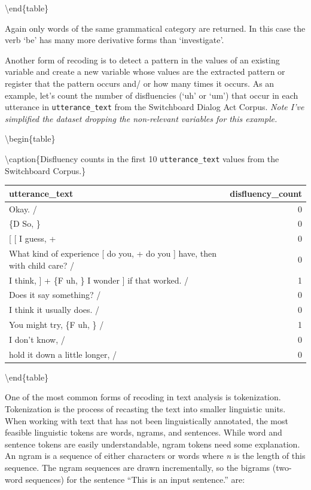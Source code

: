 \documentclass[
]{article}
\begin{document}
\textbackslash end\{table\}

Again only words of the same grammatical category are returned. In this case the verb `be' has many more derivative forms than `investigate'.

Another form of recoding is to detect a pattern in the values of an existing variable and create a new variable whose values are the extracted pattern or register that the pattern occurs and/ or how many times it occurs. As an example, let's count the number of disfluencies (`uh' or `um') that occur in each utterance in \texttt{utterance\_text} from the Switchboard Dialog Act Corpus. \emph{Note I've simplified the dataset dropping the non-relevant variables for this example.}

\textbackslash begin\{table\}

\textbackslash caption\{\label{tab:recoding-extract-switchboard}Disfluency counts in the first 10 \texttt{utterance\_text} values from the Switchboard Corpus.\}
\centering

\begin{tabular}[t]{lr}
\toprule
utterance\_text & disfluency\_count\\
\midrule
Okay.  / & 0\\
\{D So, \} & 0\\
{}[ [ I guess, + & 0\\
What kind of experience [ do you, + do you ] have, then with child care? / & 0\\
I think, ] + \{F uh, \} I wonder ] if that worked. / & 1\\
\addlinespace
Does it say something? / & 0\\
I think it usually does.  / & 0\\
You might try, \{F uh, \}  / & 1\\
I don't know,  / & 0\\
hold it down a little longer,  / & 0\\
\bottomrule
\end{tabular}

\textbackslash end\{table\}

One of the most common forms of recoding in text analysis is tokenization. Tokenization is the process of recasting the text into smaller linguistic units. When working with text that has not been linguistically annotated, the most feasible linguistic tokens are words, ngrams, and sentences. While word and sentence tokens are easily understandable, ngram tokens need some explanation. An ngram is a sequence of either characters or words where \emph{n} is the length of this sequence. The ngram sequences are drawn incrementally, so the bigrams (two-word sequences) for the sentence ``This is an input sentence.'' are:
\end{document}
